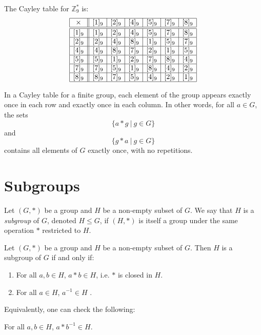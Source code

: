 \begin{example}
The Cayley table for \(\mathbb{Z}_9^*\) is:
\[
\begin{array}{|c||c | c|c|c|c|c|}
\hline
\times & [1]_9 & [2]_9 & [4]_9 & [5]_9 & [7]_9 & [8]_9 \\
\hline \hline
[1]_9 & [1]_9 & [2]_9 & [4]_9 & [5]_9 & [7]_9 & [8]_9 \\
\hline
[2]_9 & [2]_9 & [4]_9 & [8]_9 & [1]_9 & [5]_9 & [7]_9 \\
\hline
[4]_9 & [4]_9 & [8]_9 & [7]_9 & [2]_9 & [1]_9 & [5]_9 \\
\hline
[5]_9 & [5]_9 & [1]_9 & [2]_9 & [7]_9 & [8]_9 & [4]_9 \\
\hline
[7]_9 & [7]_9 & [5]_9 & [1]_9 & [8]_9 & [4]_9 & [2]_9 \\
\hline
[8]_9 & [8]_9 & [7]_9 & [5]_9 & [4]_9 & [2]_9 & [1]_9 \\
\hline
\end{array}
\]
\end{example}


\begin{proposition}
In a Cayley table for a finite group, each element of the group appears exactly once in each row and exactly once in each column. In other words, for all $a \in G$, the sets
$$\{a \ast g\ |\ g \in G\}$$
and 
$$\{g \ast a\ |\ g \in G\}$$
contains all elements of $G$ exactly once, with no repetitions.
\end{proposition}



\section{Subgroups}

\begin{definition}[Subgroup]
Let $(G, \ast)$ be a group and $H$ be a non-empty subset of $G$. We say that $H$ is a \emph{subgroup} of $G$, denoted $H \le G$, if $(H, \ast)$ is itself a group under the same operation $\ast$ restricted to $H$.
\end{definition}

\begin{proposition}
Let $(G, \ast)$ be a group and $H$ be a non-empty subset of $G$. Then $H$ is a subgroup of $G$ if and only if:
\begin{enumerate}
    \item For all $a, b \in H$, $a \ast b \in H$, i.e. $\ast$ is closed in $H$.
    \item For all $a \in H$, $a^{-1} \in H$ .
\end{enumerate}
Equivalently, one can check the following:
\begin{center}
    For all $a, b \in H$, $a \ast b^{-1} \in H$.
\end{center}
\end{proposition}

